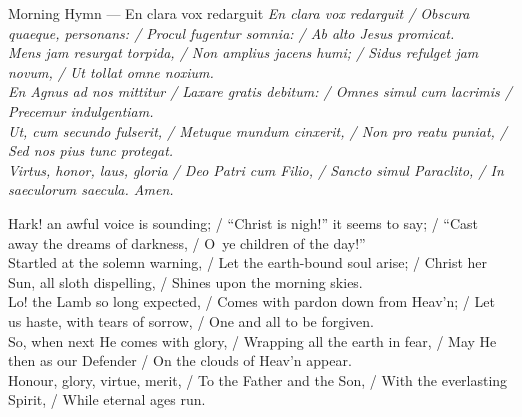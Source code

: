 \begin{massbox}{Morning Hymn --- En clara vox redarguit}
\textit{En clara vox redarguit / Obscura quaeque, personans: / Procul fugentur somnia: / Ab alto Jesus promicat.}\\
\textit{Mens jam resurgat torpida, / Non amplius jacens humi; / Sidus refulget jam novum, / Ut tollat omne noxium.}\\
\textit{En Agnus ad nos mittitur / Laxare gratis debitum: / Omnes simul cum lacrimis / Precemur indulgentiam.}\\
\textit{Ut, cum secundo fulserit, / Metuque mundum cinxerit, / Non pro reatu puniat, / Sed nos pius tunc protegat.}\\
\textit{Virtus, honor, laus, gloria / Deo Patri cum Filio, / Sancto simul Paraclito, / In saeculorum saecula. Amen.}

\medskip
Hark! an awful voice is sounding; / ``Christ is nigh!'' it seems to say; / ``Cast away the dreams of darkness, / O~ye children of the day!''\\
Startled at the solemn warning, / Let the earth-bound soul arise; / Christ her Sun, all sloth dispelling, / Shines upon the morning skies.\\
Lo! the Lamb so long expected, / Comes with pardon down from Heav'n; / Let us haste, with tears of sorrow, / One and all to be forgiven.\\
So, when next He comes with glory, / Wrapping all the earth in fear, / May He then as our Defender / On the clouds of Heav'n appear.\\
Honour, glory, virtue, merit, / To the Father and the Son, / With the everlasting Spirit, / While eternal ages run.
\end{massbox}

